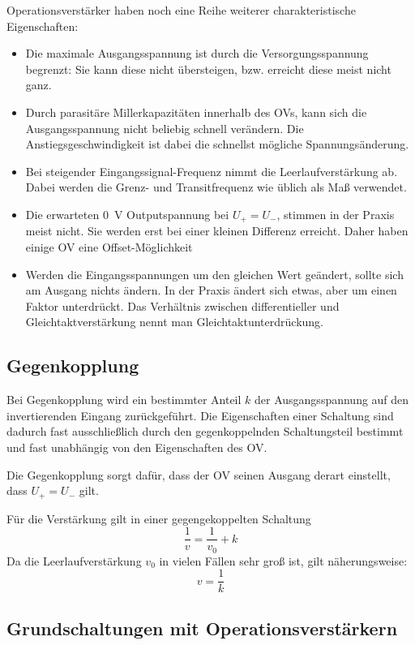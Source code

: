 Operationsverstärker haben noch eine Reihe weiterer charakteristische
Eigenschaften:
\begin{itemize}
    \item 
        Die maximale Ausgangsspannung ist durch die Versorgungsspannung
        begrenzt: Sie kann diese nicht übersteigen, bzw. erreicht diese meist
        nicht ganz.
    \item
        Durch parasitäre Millerkapazitäten innerhalb des OVs, kann sich die
        Ausgangsspannung nicht beliebig schnell verändern. Die
        Anstiegsgeschwindigkeit ist dabei die schnellst mögliche
        Spannungsänderung.
    \item
        Bei steigender Eingangssignal-Frequenz nimmt die Leerlaufverstärkung
        ab. Dabei werden die Grenz- und Transitfrequenz wie üblich als Maß
        verwendet.
    \item
        Die erwarteten \SI{0}{\volt} Outputspannung bei $U_+ = U_-$, stimmen in
        der Praxis meist nicht. Sie werden erst bei einer kleinen Differenz
        erreicht. Daher haben einige OV eine Offset-Möglichkeit
    \item
        Werden die Eingangsspannungen um den gleichen Wert geändert, sollte
        sich am Ausgang nichts ändern. In der Praxis ändert sich etwas, aber um
        einen Faktor unterdrückt. Das Verhältnis zwischen differentieller und
        Gleichtaktverstärkung nennt man Gleichtaktunterdrückung.
\end{itemize}

\FloatBarrier
\subsection{Gegenkopplung}

Bei Gegenkopplung wird ein bestimmter Anteil $k$ der Ausgangsspannung auf den
invertierenden Eingang zurückgeführt. Die Eigenschaften einer Schaltung sind
dadurch fast ausschließlich durch den gegenkoppelnden Schaltungsteil bestimmt
und fast unabhängig von den Eigenschaften des OV.

Die Gegenkopplung sorgt dafür, dass der OV seinen Ausgang derart einstellt,
dass $U_+ = U_-$ gilt.

Für die Verstärkung gilt in einer gegengekoppelten Schaltung
\[
    \frac 1v = \frac 1{v_0} + k
\]
Da die Leerlaufverstärkung $v_0$ in vielen Fällen sehr groß ist, gilt
näherungsweise:
\[
    v = \frac 1k
\]

\FloatBarrier
\subsection{Grundschaltungen mit Operationsverstärkern}

